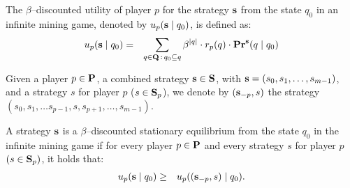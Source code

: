 \begin{mydef}
The $\beta$--discounted utility of player $p$ for the strategy $\mathbf{s}$ from the state $q_0$ in an infinite mining game, denoted by $u_p(\mathbf{s} \mid q_0)$, is defined as:
\begin{eqnarray*}
u_p(\mathbf{s} \mid q_0) & = & \sum_{q \in \mathbf{Q} \,:\, q_0 \subseteq q} \beta^{|q|} \cdot  r_p(q) \cdot \mathbf{Pr}^{\mathbf{s}}(q \mid q_0)
\end{eqnarray*}
\end{mydef}




Given a player $p \in \mathbf{P}$, a combined strategy $\mathbf{s} \in \mathbf{S}$, with $\mathbf{s} = (s_0,s_1, \ldots, s_{m-1})$, and a strategy $s$ for player $p$ ($s \in \mathbf{S}_p$), we denote by $(\mathbf{s}_{-p}, s)$ the strategy $(s_0, s_1, \ldots s_{p-1},s,s_{p+1}, \ldots, s_{m-1})$.
\begin{mydef}
A strategy $\mathbf{s}$ is a $\beta$--discounted stationary equilibrium from the state $q_0$ in  the infinite mining game if for every player $p \in \mathbf{P}$ and every strategy $s$ for player $p$ $(s \in\mathbf{S}_p)$, it holds that:
\begin{eqnarray*}u_p(\mathbf{s} \mid q_0)  & \geq  & u_p ((\mathbf{s}_{-p},s) \mid q_0).
\end{eqnarray*}
\end{mydef}


